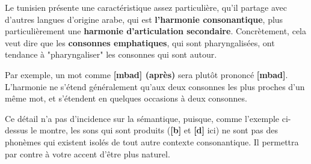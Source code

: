 Le tunisien présente une caractéristique assez particulière, qu'il partage avec d'autres langues d'origine arabe, qui est \textbf{l'harmonie consonantique}, plus particulièrement une \textbf{harmonie d'articulation secondaire}. Concrètement, cela veut dire que les \textbf{consonnes emphatiques}, qui sont pharyngalisées, ont tendance à "pharyngaliser" les consonnes qui sont autour. 

Par exemple, un mot comme \textbf{[mba\textrevglotstop \textschwa d] (après)} sera plutôt prononcé \textbf{[mb\super\textrevglotstop a\textrevglotstop \textschwa d\super\textrevglotstop]}. L'harmonie ne s'étend généralement qu'aux deux consonnes les plus proches d'un même mot, et s'étendent en quelques occasions à deux consonnes.

Ce détail n'a pas d'incidence sur la sémantique, puisque, comme l'exemple ci-dessus le montre, les sons qui sont produits (\textbf{[b\super\textrevglotstop]} et \textbf{[d\super\textrevglotstop]} ici) ne sont pas des phonèmes qui existent isolés de tout autre contexte consonantique. Il permettra par contre à votre accent d'être plus naturel.
